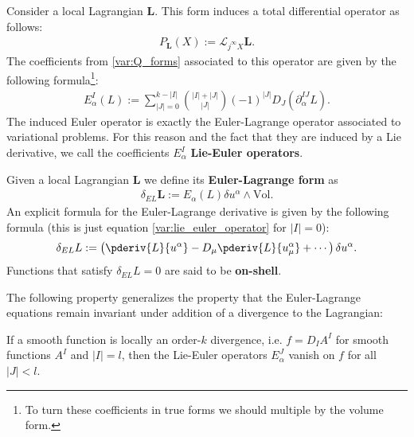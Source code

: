     \begin{example}
        Consider a local Lagrangian $\mathbf{L}$. This form induces a total differential operator as follows:
        \begin{gather}
            P_{\mathbf{L}}(X) := \mathcal{L}_{j^\infty X}\mathbf{L}.
        \end{gather}
        The coefficients from \ref{var:Q_forms} associated to this operator are given by the following formula\footnote{To turn these coefficients in true forms we should multiple by the volume form.}:
        \begin{gather}
            \label{var:lie_euler_operator}
            E^I_\alpha(L) := \sum_{|J|=0}^{k-|I|}\binom{|I|+|J|}{|J|}(-1)^{|J|}D_J\left(\partial^{IJ}_\alpha L\right).
        \end{gather}
        The induced Euler operator is exactly the Euler-Lagrange operator associated to variational problems. For this reason and the fact that they are induced by a Lie derivative, we call the coefficients $E^I_\alpha$ \textbf{Lie-Euler operators}.

        Given a local Lagrangian $\mathbf{L}$ we define its \textbf{Euler-Lagrange form} as
        \begin{gather}
            \delta_{EL}\mathbf{L} := E_\alpha(L)\delta u^\alpha\wedge\text{Vol}.
        \end{gather}
        An explicit formula for the Euler-Lagrange derivative is given by the following formula (this is just equation \ref{var:lie_euler_operator} for $|I|=0$):
        \begin{gather}
            \delta_{EL}L := \left(\pderiv{L}{u^\alpha} - D_\mu\pderiv{L}{u^\alpha_\mu} + \cdots\right)\delta u^\alpha.
        \end{gather}
        Functions that satisfy $\delta_{EL}L=0$ are said to be \textbf{on-shell}.
    \end{example}

    The following property generalizes the property that the Euler-Lagrange equations remain invariant under addition of a divergence to the Lagrangian:
    \begin{property}
        If a smooth function is locally an order-$k$ divergence, i.e. $f=D_IA^I$ for smooth functions $A^I$ and $|I|=l$, then the Lie-Euler operators $E^J_\alpha$ vanish on $f$ for all $|J|<l$.
    \end{property}

